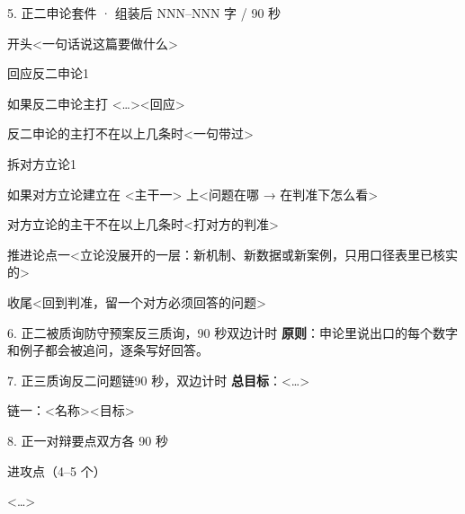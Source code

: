 \documentclass[script,pro]{debate}   %
\begin{document}
\begin{kit}{5. 正二申论}{套件 · 组装后 NNN–NNN 字 / 90 秒}
\begin{fixed}{开头}<一句话说这篇要做什么>\end{fixed}
\begin{pick}{回应反二申论}{1}
\begin{module}{如果反二申论主打 <…>}<回应>\end{module}
\begin{fallback}{反二申论的主打不在以上几条时}<一句带过>\end{fallback}
\end{pick}
\begin{pick}{拆对方立论}{1}
\begin{module}{如果对方立论建立在 <主干一> 上}<问题在哪 → 在判准下怎么看>\end{module}
\begin{fallback}{对方立论的主干不在以上几条时}<打对方的判准>\end{fallback}
\end{pick}
\begin{fixed}{推进论点一}<立论没展开的一层：新机制、新数据或新案例，只用口径表里已核实的>\end{fixed}
\begin{fixed}{收尾}<回到判准，留一个对方必须回答的问题>\end{fixed}
\end{kit}

\begin{stage}{6. 正二被质询防守预案}{反三质询，90 秒双边计时}
\textbf{原则}：申论里说出口的每个数字和例子都会被追问，逐条写好回答。
\begin{qa}
\end{qa}
\end{stage}

\begin{stage}{7. 正三质询反二问题链}{90 秒，双边计时}
\textbf{总目标}：<…>
\begin{chain}{链一：<名称>}{<目标>}
\end{chain}
\end{stage}

\begin{stage}{8. 正一对辩要点}{双方各 90 秒}
\begin{points}{进攻点（4–5 个）}
\item <…>
\end{points}
\end{stage}
\end{document}
